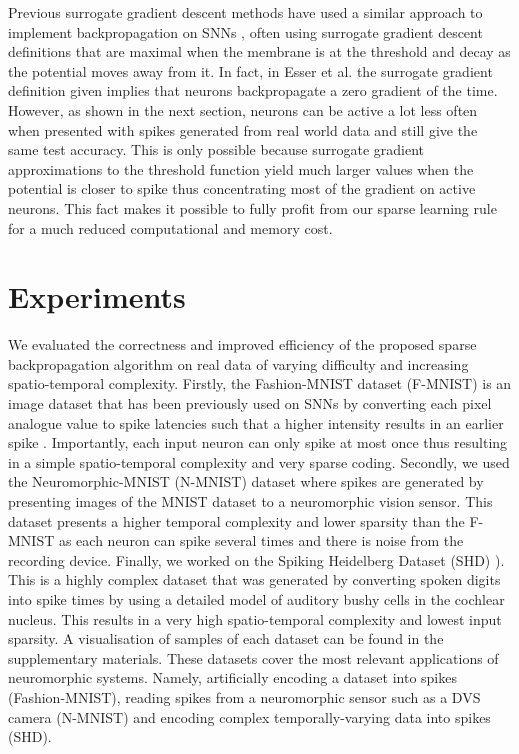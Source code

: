 \documentclass{article}
\begin{document}
Previous surrogate gradient descent methods have used a similar approach to implement backpropagation on SNNs \cite{esser2016convolutional, Shresta2018SLAYER, yin2020effective, perez2021neural, zenke2021remarkable}, often using surrogate gradient descent definitions that are maximal when the membrane is at the threshold and decay as the potential moves away from it. In fact, in Esser et al. \cite{esser2016convolutional} the surrogate gradient definition given implies that neurons backpropagate a zero gradient  of the time. However, as shown in the next section, neurons can  be active a lot less often when presented with spikes generated from real world data and still give the same test accuracy. This is only possible because surrogate gradient approximations to the threshold function yield much larger values when the potential is closer to spike thus concentrating most of the gradient on active neurons. This fact makes it possible to fully profit from our sparse learning rule for a much reduced computational and memory cost.

\section{Experiments}\label{section:experiments}

We evaluated the correctness and improved efficiency of the proposed sparse backpropagation algorithm on real data of varying difficulty and increasing spatio-temporal complexity. Firstly, the Fashion-MNIST dataset (F-MNIST) \cite{xiao2017fashion} is an image dataset that has been previously used on SNNs by converting each pixel analogue value to spike latencies such that a higher intensity results in an earlier spike \cite{perez2021neural}\cite{zenke2021remarkable}. Importantly, each input neuron can only spike at most once thus resulting in a simple spatio-temporal complexity and very sparse coding. Secondly, we used the Neuromorphic-MNIST (N-MNIST) \cite{orchard2015converting} dataset where spikes are generated by presenting images of the MNIST dataset to a neuromorphic vision sensor. This dataset presents a higher temporal complexity and lower sparsity than the F-MNIST as each neuron can spike several times and there is noise from the recording device. Finally, we worked on the Spiking Heidelberg Dataset (SHD) \cite{cramer2020heidelberg}). This is a highly complex dataset that was generated by converting spoken digits into spike times by using a detailed model of auditory bushy cells in the cochlear nucleus. This results in a very high spatio-temporal complexity and lowest input sparsity. A visualisation of samples of each dataset can be found in the supplementary materials. These datasets cover the most relevant applications of neuromorphic systems. Namely, artificially encoding a dataset into spikes (Fashion-MNIST), reading spikes from a neuromorphic sensor such as a DVS camera (N-MNIST) and encoding complex temporally-varying data into spikes (SHD).
\end{document}
